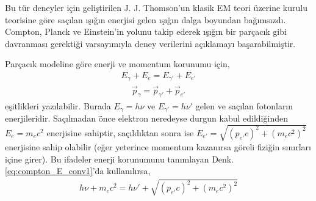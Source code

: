 \documentclass[a4paper,12pt, twoside]{article}
\begin{document}
Bu tür deneyler için geliştirilen J. J. Thomson'un \cite{Thomson1906} klasik EM teori üzerine kurulu teorisine göre saçılan ışığın enerjisi gelen ışığın dalga boyundan bağımsızdı. Compton, Planck ve Einstein'in yolunu takip ederek ışığın bir parçacık gibi davranması gerektiği varsayımıyla deney verilerini açıklamayı başarabilmiştir.

Parçacık modeline göre enerji ve momentum korunumu için,
\begin{align}
\label{eq:compton_E_conv1}
E_\gamma + E_e = E_{\gamma'} + E_{e'}
\end{align}
\begin{align}
\label{eq:compton_E_conv2}
\vec{p}_\gamma = \vec{p}_{\gamma'} + \vec{p}_{e'}
\end{align}
eşitlikleri yazılabilir. Burada $E_{\gamma} = h\nu$ ve $E_{\gamma'} = h\nu'$ gelen ve saçılan fotonların enerjileridir. Saçılmadan önce elektron neredeyse durgun kabul edildiğinden $E_e = m_ec^2$ enerjisine sahiptir, saçıldıktan sonra ise $E_{e'} = \sqrt{(p_{e'}c)^2 + (m_ec^2)^2}$ enerjisine sahip olabilir (eğer yeterince momentum kazanırsa göreli fiziğin sınırları içine girer). Bu ifadeler  enerji korunumunu tanımlayan Denk. \ref{eq:compton_E_conv1}'da kullanılırsa,
\begin{align}
\label{eq:compton_E_conv3}
h\nu + m_e c^2 = h\nu' + \sqrt{(p_{e'}c)^2 + (m_e c^2)^2}
\end{align}
\end{document}
